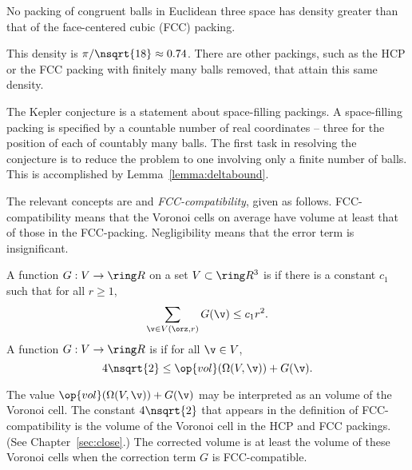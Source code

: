 \begin{cnl}
\begin{theorem*}
\label{theorem:kepler}
No packing of congruent balls in Euclidean three space has density
greater than that of the face-centered cubic (FCC) packing.
\end{theorem*}
%
%
%
%
%

\begin{remark}
This density is $\pi/\nsqrt{18}\approx 0.74$.  There are other
packings, such as the HCP or the FCC
packing with finitely many balls removed, that attain this
same density.
\end{remark}

The Kepler conjecture is a statement about space-filling packings.  A
space-filling packing is specified by a countable number of real
coordinates -- three for the position of each of countably many balls.
The first task in resolving the conjecture is to reduce the problem to
one involving only a finite number of balls.  This is accomplished by
Lemma~\ref{lemma:deltabound}.

The relevant concepts are  and {\it
  FCC-compatibility}, given as follows.  FCC-compatibility means that
the Voronoi cells on average have volume at least that of those in the
FCC-packing.  Negligibility means that the error term is insignificant.


\begin{definition}
\label{def:negligible}
A function $G:V\to \Real$ on a set $V\subset\vecR{3}$
is 
if there is a constant $c_1$ such that for all $r\ge1$,
\[ \sumfinitepred{\v}{\v\in \Vee{V}(\orz,r)}{G(\v)} \le c_1
r^2.\] 
A function $G: V\to\Real$ is
if for all $\v\in V$, 
\[ 4\nsqrt{2}\le \op{vol}(\Omega(V,\v)) +
G(\v).\] 
%
\end{definition}


\begin{remark}
  The value $\op{vol}(\Omega(V,\v)) + G(\v)$ may be interpreted as an
   volume of the Voronoi cell. The constant
  $4\nsqrt{2}$ that appears in the definition of FCC-compatibility is
  the volume of the Voronoi cell in the HCP and FCC packings.  (See
  Chapter~\ref{sec:close}.)  The corrected volume is at least the
  volume of these Voronoi cells when the correction term $G$ is
  FCC-compatible.
%
%
\end{remark}


\end{cnl}
